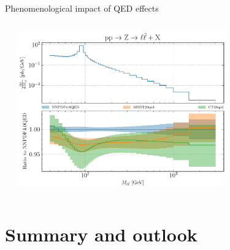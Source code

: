 \documentclass[aspectratio=169, 8pt,t]{beamer}
\begin{document}
\begin{frame}{Phenomenological impact of QED effects}
\begin{columns}[T]
\begin{column}{0.49\textwidth}
\begin{itemize}
      \end{itemize}
    \end{column}
    \begin{column}{0.49\textwidth}
      \vspace*{-3em}
      \includegraphics[width=0.7\textwidth]{figures/NNPDF_DY_14TEV_40_PHENO-global.pdf}
    \end{column}
  \end{columns}
\end{frame}


\section*{Summary and outlook}
\end{document}
